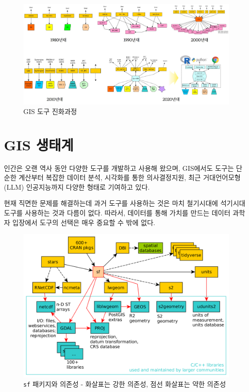 \documentclass[
  a4paper,showtrims,openright,hidelinks]{oblivoir}
\begin{document}
\begin{figure}

{\centering \includegraphics{images/gis_evolution.jpg}

}

\caption{GIS 도구 진화과정}

\end{figure}

\hypertarget{gis-uxc0dduxd0dcuxacc4}{%
\section{GIS 생태계}\label{gis-uxc0dduxd0dcuxacc4}}

인간은 오랜 역사 동안 다양한 도구를 개발하고 사용해 왔으며, GIS에서도
도구는 단순한 계산부터 복잡한 데이터 분석, 시각화를 통한 의사결정지원,
최근 거대언어모형(LLM) 인공지능까지 다양한 형태로 기여하고 있다.

현재 직면한 문제를 해결하는데 과거 도구를 사용하는 것은 마치 철기시대에
석기시대 도구를 사용하는 것과 다름이 없다. 따라서, 데이터를 통해 가치를
만드는 데이터 과학자 입장에서 도구의 선택은 매우 중요할 수 밖에 없다.

\begin{figure}

{\centering \includegraphics{images/sf_deps.png}

}

\caption{\label{fig-evolution}\texttt{sf} 패키지와 의존성 - 화살표는
강한 의존성, 점선 화살표는 약한 의존성}

\end{figure}
\end{document}

